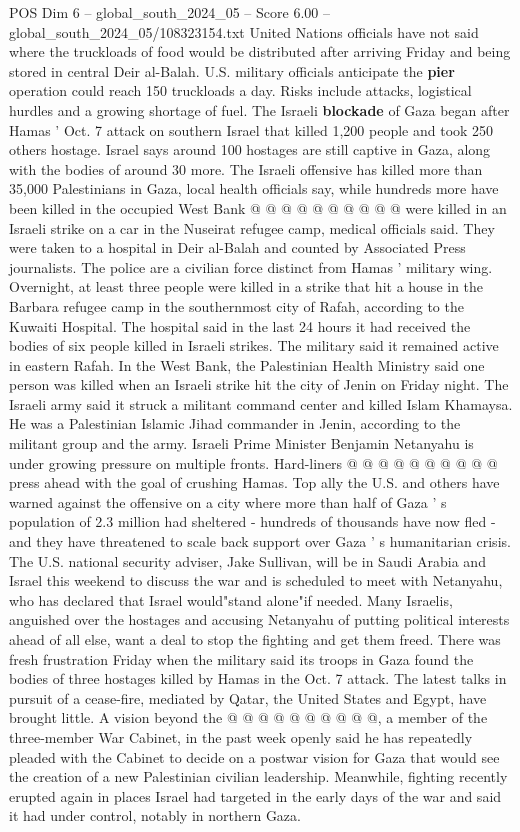 \begin{textsample}{POS Dim 6 – global\_south\_2024\_05 – Score 6.00 – global\_south\_2024\_05/108323154.txt}
United Nations officials have not said where the truckloads of food would be distributed after arriving Friday and being stored in central Deir al-Balah.
U.S. military officials anticipate the \textbf{pier} operation could reach 150 truckloads a day.
Risks include attacks, logistical hurdles and a growing shortage of fuel.
The Israeli \textbf{blockade} of Gaza began after Hamas ' Oct. 7 attack on southern Israel that killed 1,200 people and took 250 others hostage.
Israel says around 100 hostages are still captive in Gaza, along with the bodies of around 30 more.
The Israeli offensive has killed more than 35,000 Palestinians in Gaza, local health officials say, while hundreds more have been killed in the occupied West Bank @ @ @ @ @ @ @ @ @ @ were killed in an Israeli strike on a car in the Nuseirat refugee camp, medical officials said.
They were taken to a hospital in Deir al-Balah and counted by Associated Press journalists.
The police are a civilian force distinct from Hamas ' military wing.
Overnight, at least three people were killed in a strike that hit a house in the Barbara refugee camp in the southernmost city of Rafah, according to the Kuwaiti Hospital.
The hospital said in the last 24 hours it had received the bodies of six people killed in Israeli strikes.
The military said it remained active in eastern Rafah.
In the West Bank, the Palestinian Health Ministry said one person was killed when an Israeli strike hit the city of Jenin on Friday night.
The Israeli army said it struck a militant command center and killed Islam Khamaysa.
He was a Palestinian Islamic Jihad commander in Jenin, according to the militant group and the army.
Israeli Prime Minister Benjamin Netanyahu is under growing pressure on multiple fronts.
Hard-liners @ @ @ @ @ @ @ @ @ @ press ahead with the goal of crushing Hamas.
Top ally the U.S. and others have warned against the offensive on a city where more than half of Gaza ' s population of 2.3 million had sheltered - hundreds of thousands have now fled - and they have threatened to scale back support over Gaza ' s humanitarian crisis.
The U.S. national security adviser, Jake Sullivan, will be in Saudi Arabia and Israel this weekend to discuss the war and is scheduled to meet with Netanyahu, who has declared that Israel would"stand alone"if needed.
Many Israelis, anguished over the hostages and accusing Netanyahu of putting political interests ahead of all else, want a deal to stop the fighting and get them freed.
There was fresh frustration Friday when the military said its troops in Gaza found the bodies of three hostages killed by Hamas in the Oct. 7 attack.
The latest talks in pursuit of a cease-fire, mediated by Qatar, the United States and Egypt, have brought little.
A vision beyond the @ @ @ @ @ @ @ @ @ @, a member of the three-member War Cabinet, in the past week openly said he has repeatedly pleaded with the Cabinet to decide on a postwar vision for Gaza that would see the creation of a new Palestinian civilian leadership.
Meanwhile, fighting recently erupted again in places Israel had targeted in the early days of the war and said it had under control, notably in northern Gaza.

\end{textsample}
